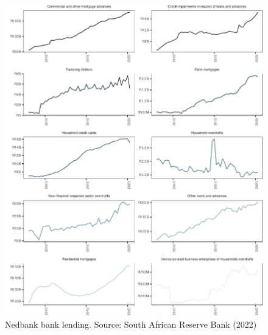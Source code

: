 \documentclass[
]{article}
\begin{document}
\begin{figure}[H]

\includegraphics{Bank_capital_and_bank_lending_files/figure-latex/ba900nedbank-1} \hfill{}

\caption{Nedbank bank lending. Source: South African Reserve Bank (2022) }\label{fig:ba900nedbank}
\end{figure}
\end{document}
